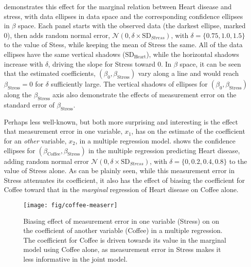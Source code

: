  demonstrates this effect for the marginal
relation between Heart disease and stress,
with data ellipses in data space and the corresponding confidence ellipses in $\beta$ space.
Each panel starts with the observed data (the darkest ellipse, marked $0$), then adds random normal error,
$\mathcal{N}(0, \delta \times \mathrm{SD}_{Stress})$, with $\delta = \{0.75, 1.0, 1.5\}$ to the value of Stess,
while keeping the mean of Stress the same.
All of the data ellipses have the same vertical shadows ($\mathrm{SD}_{\textrm{Heart}}$), while the horizontal shadows
increase with $\delta$, driving the slope for Stress toward 0.
In $\beta$ space, it can be seen that the estimated coefficients, $(\beta_0, \beta_{\textrm{Stress}})$
vary along a line and would reach $\beta_{\textrm{Stress}}=0$ for $\delta$ sufficiently large.
The vertical shadows of
ellipses for $(\beta_0, \beta_{\textrm{Stress}})$ along the $\beta_{\textrm{Stress}}$ axis
also demonstrate the effects of measurement error
on the standard error of $\beta_{\textrm{Stress}}$.

Perhaps less well-known, but both more surprising and interesting is the effect that measurement error in one variable,
$x_1$, 
has on the estimate of the coefficient for an \emph{other} variable, $x_2$, in a multiple regression model.
shows the confidence ellipses for $(\beta_{\textrm{Coffee}}, \beta_{\textrm{Stress}})$ in the multiple regression 
predicting Heart disease, adding random normal error
$\mathcal{N}(0, \delta \times \mathrm{SD}_{Stress})$, with $\delta = \{0, 0.2, 0.4, 0.8\}$ to the value of Stress
alone.  
As can be plainly seen, while this measurement error in Stress attenuates its coefficient,
it also has the effect of biasing the coefficient for Coffee toward that in the \emph{marginal}
regression of Heart disease on Coffee alone.


\begin{figure}[htb]
  \centering
  \texttt{[image: fig/coffee-measerr]}
  \caption{Biasing effect of measurement error in one variable (Stress) on on the coefficient of another variable
  (Coffee) in a multiple regression.  The coefficient for Coffee is driven towards its value in the marginal
  model using Coffee alone, as measurement error in Stress makes it less informative in the joint model.
  }%
  \label{fig:coffee-measerr}
\end{figure}



